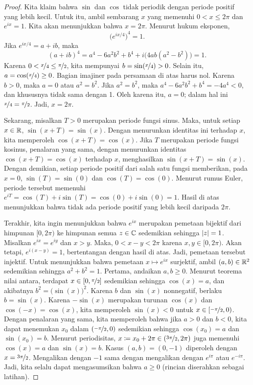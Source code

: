 \begin{proof}
Kita klaim bahwa $\sin$ dan $\cos$ tidak periodik dengan periode positif yang lebih kecil.
Untuk itu, ambil sembarang $x$ yang memenuhi $0 < x \leq 2\pi$ dan
$e^{ix} = 1$. Kita akan menunjukkan bahwa $x = 2\pi$.
Menurut hukum eksponen,
\begin{equation*}
{\bigl(e^{ix/4}\bigr)}^4 = 1 .
\end{equation*}
Jika $e^{ix/4} = a+ib$, maka
\begin{equation*}
{(a+ib)}^4
=a^4-6a^2b^2+b^4 + i\bigl(4ab(a^2-b^2)\bigr)
=1 .
\end{equation*}
Karena $0 < \nicefrac{x}{4} \leq \nicefrac{\pi}{2}$, kita mempunyai
$b = \sin(\nicefrac{x}{4}) > 0$.
Selain itu, $a = \cos(\nicefrac{x}{4}) \geq 0$. Bagian imajiner pada persamaan di atas
harus nol. Karena $b > 0$, maka $a = 0$ atau $a^2 = b^2$.
Jika $a^2=b^2$, maka
$a^4-6a^2b^2+b^4 = -4a^4 < 0$, dan khususnya tidak sama dengan 1.
Oleh karena itu, $a=0$; dalam hal ini $\nicefrac{x}{4} = \nicefrac{\pi}{2}$.
Jadi, $x = 2\pi$.

Sekarang, misalkan $T > 0$ merupakan periode fungsi sinus. Maka, untuk setiap $x \in {\mathbb{R}}$,
$\sin(x+T)=\sin(x)$. Dengan menurunkan identitas ini terhadap $x$, kita memperoleh
$\cos(x+T)=\cos(x)$. Jika $T$ merupakan periode fungsi kosinus, penalaran yang sama,
dengan menurunkan identitas $\cos(x+T)=\cos(x)$ terhadap $x$, menghasilkan
$\sin(x+T)=\sin(x)$. Dengan demikian, setiap periode positif dari salah satu fungsi
memberikan, pada $x=0$, $\sin(T)=\sin(0)$ dan $\cos(T)=\cos(0)$.
Menurut rumus Euler, periode tersebut memenuhi
$e^{iT}=\cos(T)+i\sin(T)=\cos(0)+i\sin(0)=1$.
Hasil di atas menunjukkan bahwa tidak ada periode positif yang lebih kecil daripada $2\pi$.

Terakhir, kita ingin menunjukkan bahwa $e^{ix}$ merupakan pemetaan bijektif
dari himpunan $[0,2\pi)$ ke himpunan semua $z \in {\mathbb{C}}$ sedemikian sehingga
$\lvert {z} \rvert = 1$. Misalkan $e^{ix} = e^{iy}$ dan
$x > y$. Maka,
$0 < x-y < 2\pi$ karena $x,y \in [0,2\pi)$. Akan tetapi, $e^{i(x-y)} = 1$,
bertentangan dengan hasil di atas. Jadi, pemetaan tersebut injektif.
Untuk menunjukkan bahwa pemetaan $x \mapsto e^{ix}$ surjektif, ambil $(a,b) \in {\mathbb{R}}^2$ sedemikian sehingga $a^2+b^2 = 1$.
Pertama, andaikan $a,b \geq 0$. Menurut teorema nilai antara,
terdapat $x \in [0,\nicefrac{\pi}{2}]$ sedemikian sehingga
$\cos(x) = a$, dan akibatnya $b^2 = \bigl(\sin(x)\bigr)^2$. Karena
$b$ dan $\sin(x)$ nonnegatif, berlaku $b = \sin(x)$.
Karena $-\sin(x)$ merupakan turunan $\cos(x)$
dan $\cos(-x) = \cos(x)$,
kita memperoleh $\sin(x) < 0$ untuk $x \in [\nicefrac{-\pi}{2},0)$.
Dengan penalaran yang sama, kita memperoleh bahwa
jika $a > 0$ dan $b < 0$, kita dapat menemukan $x_0$ dalam $(\nicefrac{-\pi}{2},0)$
sedemikian sehingga $\cos(x_0) = a$ dan $\sin(x_0)=b$. Menurut periodisitas,
$x \coloneqq x_0+2\pi \in (\nicefrac{3\pi}{2},2\pi)$ juga memenuhi
$\cos(x) = a$ dan $\sin(x)=b$. Kasus $(a,b)=(0,-1)$ diperoleh dengan $x=\nicefrac{3\pi}{2}$.
Mengalikan dengan $-1$ sama dengan mengalikan dengan $e^{i\pi}$ atau
$e^{-i\pi}$. Jadi, kita selalu dapat mengasumsikan bahwa $a \geq 0$ (rincian diserahkan
sebagai latihan).
\end{proof}

